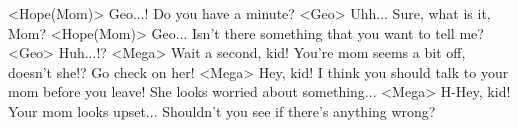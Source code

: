<Hope(Mom)> Geo...! Do you have a minute? 
<Geo> Uhh... Sure, what is it, Mom? 
<Hope(Mom)> Geo... Isn't there something that you want to tell me? 
<Geo> Huh...!? 
<Mega> Wait a second, kid! 
You're mom seems a bit off, doesn't she!? Go check on her! 
<Mega> Hey, kid! I think you should talk to your mom before you leave! 
She looks worried about something... 
<Mega> H-Hey, kid! 
Your mom looks upset... 
Shouldn't you see if there's anything wrong? 
